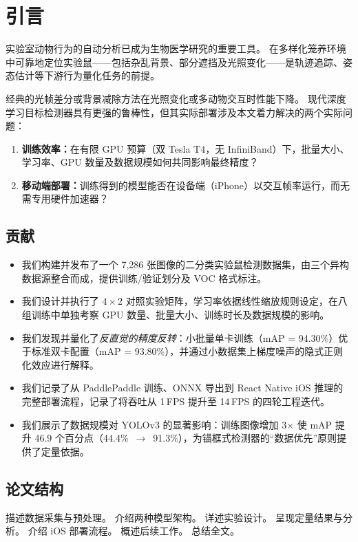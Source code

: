 \section{引言}
\label{sec:intro}

实验室动物行为的自动分析已成为生物医学研究的重要工具。
在多样化笼养环境中可靠地定位实验鼠——包括杂乱背景、部分遮挡及光照变化——是轨迹追踪、姿态估计等下游行为量化任务的前提。

经典的光帧差分或背景减除方法在光照变化或多动物交互时性能下降。
现代深度学习目标检测器具有更强的鲁棒性，但其实际部署涉及本文着力解决的两个实际问题：

\begin{enumerate}[leftmargin=1.5em]
  \item \textbf{训练效率：}在有限 GPU 预算（双 Tesla T4，无 InfiniBand）下，批量大小、学习率、GPU 数量及数据规模如何共同影响最终精度？

  \item \textbf{移动端部署：}训练得到的模型能否在设备端（iPhone）以交互帧率运行，而无需专用硬件加速器？
\end{enumerate}

\subsection*{贡献}

\begin{itemize}[leftmargin=1.5em]
  \item 我们构建并发布了一个 7,286 张图像的二分类实验鼠检测数据集，由三个异构数据源整合而成，提供训练/验证划分及 VOC 格式标注。

  \item 我们设计并执行了 $4\!\times\!2$ 对照实验矩阵，学习率依据线性缩放规则设定，在八组训练中单独考察 GPU 数量、批量大小、训练时长及数据规模的影响。

  \item 我们发现并量化了\emph{反直觉的精度反转}：小批量单卡训练（mAP = 94.30\%）优于标准双卡配置（mAP = 93.80\%），并通过小数据集上梯度噪声的隐式正则化效应进行解释。

  \item 我们记录了从 PaddlePaddle 训练、ONNX 导出到 React Native iOS 推理的完整部署流程，记录了将吞吐从 1\,FPS 提升至 14\,FPS 的四轮工程迭代。

  \item 我们展示了数据规模对 YOLOv3 的显著影响：训练图像增加 3$\times$ 使 mAP 提升 46.9 个百分点（44.4\%~$\to$~91.3\%），为锚框式检测器的“数据优先”原则提供了定量依据。
\end{itemize}

\subsection*{论文结构}

 描述数据采集与预处理。
 介绍两种模型架构。
 详述实验设计。
 呈现定量结果与分析。
 介绍 iOS 部署流程。
 概述后续工作。
 总结全文。
